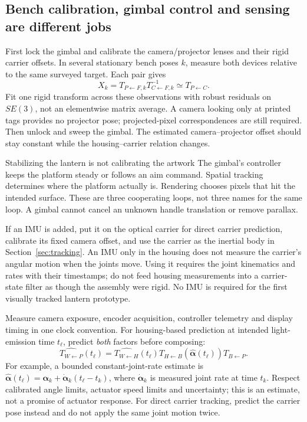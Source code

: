 \documentclass[11pt,a4paper]{article}
\newcommand{\T}[2]{T_{#1\leftarrow #2}}
\begin{document}
\subsection{Bench calibration, gimbal control and sensing are different jobs}
First lock the gimbal and calibrate the camera/projector lenses and their
rigid carrier offsets. In several stationary bench poses $k$, measure both
devices relative to the same surveyed target. Each pair gives
\begin{equation}
X_k=\T{P}{F,k}\T{C}{F,k}^{-1}\simeq\T{P}{C}.
\end{equation}
Fit one rigid transform across these observations with robust residuals
on $SE(3)$, not an elementwise matrix average.
A camera looking only at printed tags provides no projector pose;
projected-pixel correspondences are still required.
Then unlock and sweep the gimbal. The estimated camera--projector offset
should stay constant while the housing--carrier relation changes.

\begin{plain}{Stabilizing the lantern is not calibrating the artwork}
The gimbal's controller keeps the platform steady or follows an aim
command. Spatial tracking determines where the platform actually is.
Rendering chooses pixels that hit the intended surface.
These are three cooperating loops, not three names for the same loop.
A gimbal cannot cancel an unknown handle translation or remove parallax.
\end{plain}

If an IMU is added, put it on the optical carrier for direct carrier
prediction, calibrate its fixed camera offset, and use the carrier as
the inertial body in Section~\ref{sec:tracking}.
An IMU only in the housing does not measure the carrier's angular motion
when the joints move. Using it requires the joint kinematics and rates
with their timestamps; do not feed housing measurements into a
carrier-state filter as though the assembly were rigid.
No IMU is required for the first visually tracked lantern prototype.

Measure camera exposure, encoder acquisition, controller telemetry and
display timing in one clock convention.
For housing-based prediction at intended light-emission time $t_\ell$,
predict \emph{both} factors before composing:
\begin{equation}
\hat{\T{W}{P}}(t_\ell)=
\hat{\T{W}{H}}(t_\ell)
\T{H}{B}(\hat{\bm{\alpha}}(t_\ell))\T{B}{P}.
\end{equation}
For example, a bounded constant-joint-rate estimate is
$\hat{\bm{\alpha}}(t_\ell)=\bm{\alpha}_k+
\dot{\bm{\alpha}}_k(t_\ell-t_k)$, where
$\dot{\bm{\alpha}}_k$ is measured joint rate at time $t_k$.
Respect calibrated angle limits, actuator speed limits and uncertainty;
this is an estimate, not a promise of actuator response.
For direct carrier tracking, predict the carrier pose instead and do
not apply the same joint motion twice.
\end{document}
